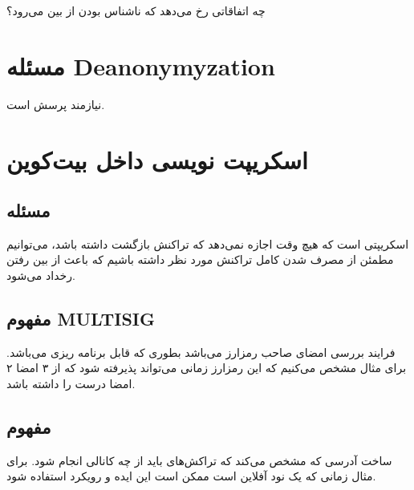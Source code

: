 \documentclass[10pt, a4paper]{article}
\begin{document}
چه اتفاقاتی رخ می‌دهد که ناشناس بودن از بین می‌رود؟

\section{مسئله Deanonymyzation}

نیازمند پرسش است.

\section{اسکریپت نویسی داخل بیت‌کوین}

\subsection{مسئله }

اسکریپتی است که هیچ وقت اجازه نمی‌دهد که تراکنش بازگشت داشته باشد، می‌توانیم
مطمئن از مصرف شدن کامل تراکنش مورد نظر داشته باشیم که باعث از بین رفتن رخداد
 می‌شود.

\subsection{مفهوم MULTISIG}

فرایند بررسی امضای صاحب رمزارز می‌باشد بطوری که قابل برنامه ریزی می‌باشد. برای
مثال مشخص می‌کنیم که این رمزارز زمانی می‌تواند پذیرفته شود که از ۳ امضا ۲ امضا
درست را داشته باشد.

\subsection{مفهوم }

ساخت آدرسی که مشخص می‌کند که تراکش‌های باید از چه کانالی انجام شود. برای مثال
زمانی که یک نود آفلاین است ممکن است این ایده و رویکرد استفاده شود.
\end{document}
